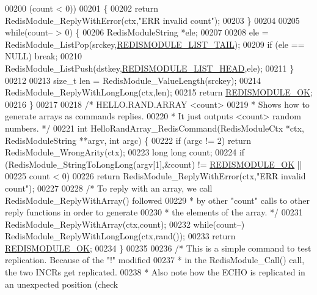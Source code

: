 \begin{DoxyCode}
00200         (count < 0))
00201     \{
00202         \textcolor{keywordflow}{return} RedisModule\_ReplyWithError(ctx,\textcolor{stringliteral}{"ERR invalid count"});
00203     \}
00204 
00205     \textcolor{keywordflow}{while}(count-- > 0) \{
00206         RedisModuleString *ele;
00207 
00208         ele = RedisModule\_ListPop(srckey,\hyperlink{redismodule_8h_a15271c33eee2d766df968558d1e0357c}{REDISMODULE\_LIST\_TAIL});
00209         \textcolor{keywordflow}{if} (ele == NULL) \textcolor{keywordflow}{break};
00210         RedisModule\_ListPush(dstkey,\hyperlink{redismodule_8h_a6ca6298fda4f019c7585d34b870fd5f1}{REDISMODULE\_LIST\_HEAD},ele);
00211     \}
00212 
00213     size\_t len = RedisModule\_ValueLength(srckey);
00214     RedisModule\_ReplyWithLongLong(ctx,len);
00215     \textcolor{keywordflow}{return} \hyperlink{redismodule_8h_a1bc5bfd69abcd378ff52c640adc5418d}{REDISMODULE\_OK};
00216 \}
00217 
00218 \textcolor{comment}{/* HELLO.RAND.ARRAY <count>}
00219 \textcolor{comment}{ * Shows how to generate arrays as commands replies.}
00220 \textcolor{comment}{ * It just outputs <count> random numbers. */}
00221 \textcolor{keywordtype}{int} HelloRandArray\_RedisCommand(RedisModuleCtx *ctx, RedisModuleString **argv, \textcolor{keywordtype}{int} argc) \{
00222     \textcolor{keywordflow}{if} (argc != 2) \textcolor{keywordflow}{return} RedisModule\_WrongArity(ctx);
00223     \textcolor{keywordtype}{long} \textcolor{keywordtype}{long} count;
00224     \textcolor{keywordflow}{if} (RedisModule\_StringToLongLong(argv[1],&count) != \hyperlink{redismodule_8h_a1bc5bfd69abcd378ff52c640adc5418d}{REDISMODULE\_OK} ||
00225         count < 0)
00226         \textcolor{keywordflow}{return} RedisModule\_ReplyWithError(ctx,\textcolor{stringliteral}{"ERR invalid count"});
00227 
00228     \textcolor{comment}{/* To reply with an array, we call RedisModule\_ReplyWithArray() followed}
00229 \textcolor{comment}{     * by other "count" calls to other reply functions in order to generate}
00230 \textcolor{comment}{     * the elements of the array. */}
00231     RedisModule\_ReplyWithArray(ctx,count);
00232     \textcolor{keywordflow}{while}(count--) RedisModule\_ReplyWithLongLong(ctx,rand());
00233     \textcolor{keywordflow}{return} \hyperlink{redismodule_8h_a1bc5bfd69abcd378ff52c640adc5418d}{REDISMODULE\_OK};
00234 \}
00235 
00236 \textcolor{comment}{/* This is a simple command to test replication. Because of the "!" modified}
00237 \textcolor{comment}{ * in the RedisModule\_Call() call, the two INCRs get replicated.}
00238 \textcolor{comment}{ * Also note how the ECHO is replicated in an unexpected position (check}

\end{DoxyCode}
